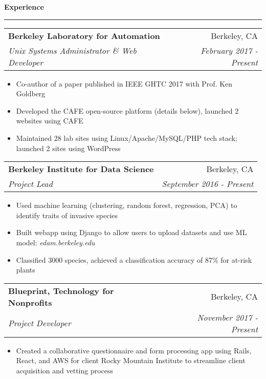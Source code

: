 \documentclass[11pt,letterpaper]{article}
\makeatletter
\newenvironment{topic}[1]
    {
    {\Large \centerline{#1}}
    \vspace*{0.03in}
    \hrule 
    \vspace*{0.05in}
    }
    {}
\newenvironment{event}
    {
    \begin{tabular*}{\textwidth}{l@{\extracolsep{\fill}}r}
    }
    {
    \end{tabular*}
    }
\makeatother
\begin{document}
    \begin{topic}{\textbf{Experience}}
        \begin{event}
            \textbf{Berkeley Laboratory for Automation} & Berkeley, CA \\
            \emph{Unix Systems Administrator \& Web Developer} & \emph{February 2017 - Present}
        \end{event}
            \begin{itemize}
                \item Co-author of a paper published in IEEE GHTC 2017 with Prof. Ken Goldberg
                \item Developed the CAFE open-source platform (details below), launched 2 websites using CAFE
                \item Maintained 28 lab sites using Linux/Apache/MySQL/PHP tech stack; launched 2 sites using WordPress
            \end{itemize}

        \begin{event}
            \textbf{Berkeley Institute for Data Science} & Berkeley, CA \\
            \emph{Project Lead} & \emph{September 2016 - Present} \\
        \end{event}
            \begin{itemize}
                \item Used machine learning (clustering, random forest, regression, PCA) to identify traits of invasive species
                \item Built webapp using Django to allow users to upload datasets and use ML model: \emph{edam.berkeley.edu}
                \item Classified 3000 species, achieved a classification accuracy of 87\% for at-risk plants
            \end{itemize}

        \begin{event}
            \textbf{Blueprint, Technology for Nonprofits} & Berkeley, CA \\
            \emph{Project Developer} & \emph{November 2017 - Present}
        \end{event}
            \begin{itemize}
                \item Created a collaborative questionnaire and form processing app using Rails, React, and AWS for client Rocky Mountain Institute to streamline client acquisition and vetting process
            \end{itemize}
        
    \end{topic} \vspace*{0.1in}
\end{document}
